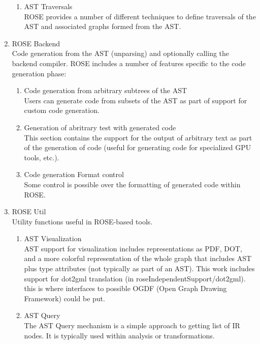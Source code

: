 \begin{enumerate}
\begin{enumerate}
      \item AST Traversals \\
         ROSE provides a number of different techniques to define traversals of the AST
         and associated graphs formed from the AST. 
   \end{enumerate}

   \item ROSE Backend \\
      Code generation from the AST (unparsing) and optionally calling the backend
      compiler.  ROSE includes a number of features specific to the code generation phase: 
   \begin{enumerate}
      \item Code generation from arbitrary subtrees of the AST \\
         Users can generate code from subsets of the AST as part of support for custom
         code generation.
      \item Generation of abritrary test with generated code \\
         This section contains the support for the output of arbitrary text as part of the
         generation of code (useful for generating code for specialized GPU tools, etc.).
      \item Code generation Format control \\
         Some control is possible over the formatting of generated code within ROSE.
   \end{enumerate}


   \item ROSE Util \\
      Utility functions useful in ROSE-based tools.
   \begin{enumerate}
      \item AST Visualization \\
         AST support for visualization includes representations as PDF, DOT, and
         a more colorful representation of the whole graph that includes AST plus 
         type attributes (not typically as part of an AST). This work includes
         support for dot2gml translation (in roseIndependentSupport/dot2gml).
         this is where interfaces to possible OGDF (Open Graph Drawing Framework)
         could be put.

      \item AST Query \\
         The AST Query mechanism is a simple approach to getting list of IR nodes.
         It is typically used within analysis or transformations.


\end{enumerate}
\end{enumerate}
